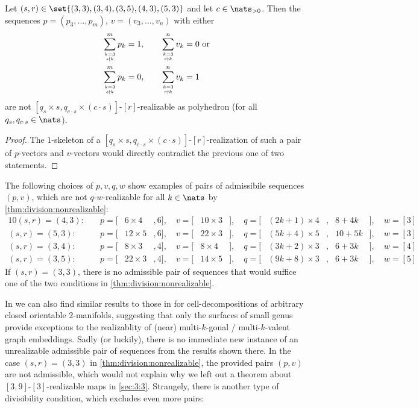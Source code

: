 \begin{corollary}\label{thm:division:nonrealizable}
  Let $(s, r) \in \set{(3, 3), (3, 4), (3, 5), (4, 3), (5, 3)}$ and let $c \in \nats_{> 0}$. Then the sequences $p = (p_3, \dots, p_m)$, $v = (v_3, \dots, v_n)$ with either
  \begin{align*}
    \sum_{k = 3 \atop s \nmid k}^m p_k = 1, \qquad&\sum_{k = 3 \atop r \nmid k}^n v_k = 0 \text{~or} \\
    \sum_{k = 3 \atop s \nmid k}^m p_k = 0, \qquad&\sum_{k = 3 \atop r \nmid k}^n v_k = 1
  \end{align*}
  are not $[q_s \times s, q_{c \cdot s} \times (c \cdot s)]$-$[r]$-realizable as polyhedron (for all $q_s, q_{c \cdot s} \in \nats$).
\begin{proof}
  The $1$-skeleton of a $[q_s \times s, q_{c \cdot s} \times (c \cdot s)]$-$[r]$-realization of such a pair of $p$-vectors and $v$-vectors would directly contradict the previous one of two statements.
\end{proof}
\end{corollary}

\begin{example}
  The following choices of $p, v, q, w$ show examples of pairs of admissibile sequences $(p, v)$, which are not $q$-$w$-realizable for all $k \in \nats$ by \autoref{thm:division:nonrealizable}:
  \begin{alignat*}{10}
    (s, r) = (4, 3):\quad& p = [& 6 \times 4&, 6], \quad v = [&10 \times 3&], \quad q = [&(2k + 1) \times 4&,{} & 8 + 4k&], \quad w = [3]\\
    (s, r) = (5, 3):\quad& p = [&12 \times 5&, 6], \quad v = [&22 \times 3&], \quad q = [&(5k + 4) \times 5&,{} &10 + 5k&], \quad w = [3]\\
    (s, r) = (3, 4):\quad& p = [& 8 \times 3&, 4], \quad v = [& 8 \times 4&], \quad q = [&(3k + 2) \times 3&,{} & 6 + 3k&], \quad w = [4]\\
    (s, r) = (3, 5):\quad& p = [&22 \times 3&, 4], \quad v = [&14 \times 5&], \quad q = [&(9k + 8) \times 3&,{} & 6 + 3k&], \quad w = [5]
  \end{alignat*}
  If $(s, r) = (3, 3)$, there is no admissible pair of sequences that would suffice one of the two conditions in \autoref{thm:division:nonrealizable}.
\end{example}

In \cite{horvnak1977nearly} we can also find similar results to those in \cite{malkevitch1970properties} for cell-decompositions of arbitrary closed orientable $2$-manifolds, suggesting that only the surfaces of small genus provide exceptions to the realizablity of (near) multi-$k$-gonal / multi-$k$-valent graph embeddings. Sadly (or luckily), there is no immediate new instance of an unrealizable admissible pair of sequences from the results shown there. In the case $(s, r) = (3, 3)$ in \autoref{thm:division:nonrealizable}, the provided pairs $(p, v)$ are not admissible, which would not explain why we left out a theorem about $[3, 9]$-$[3]$-realizable maps in \autoref{sec:3:3}. Strangely, there is another type of divisibility condition, which excludes even more pairs:

